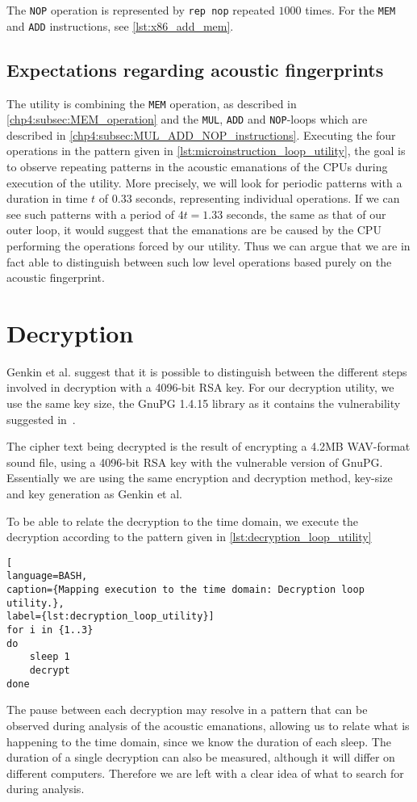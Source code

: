 The \texttt{NOP} operation is represented by \texttt{rep nop} repeated \(1000\) times.
For the \texttt{MEM} and \texttt{ADD} instructions, see \autoref{lst:x86_add_mem}.


\subsection{Expectations regarding acoustic fingerprints}
The utility is combining the \texttt{MEM} operation, as described in \autoref{chp4:subsec:MEM_operation} and the \texttt{MUL}, \texttt{ADD} and \texttt{NOP}-loops which are described in \autoref{chp4:subsec:MUL_ADD_NOP_instructions}.
Executing the four operations in the pattern given in \autoref{lst:microinstruction_loop_utility}, the goal is to observe repeating patterns in the acoustic emanations of the \gls{CPU}s during execution of the utility.
More precisely, we will look for periodic patterns with a duration in time \(t\) of \(0.33\) seconds, representing individual operations. 
If we can see such patterns with a period of \(4t = 1.33\) seconds, the same as that of our outer loop, it would suggest that the emanations are be caused by the \gls{CPU} performing the operations forced by our utility.
Thus we can argue that we are in fact able to distinguish between such low level operations based purely on the acoustic fingerprint. 


\section{Decryption}\label{chp4:sec:decryption}
Genkin et al. suggest that it is possible to distinguish between the different steps involved in decryption with a 4096-bit RSA key.
For our decryption utility, we use the same key size, the GnuPG 1.4.15 library as it contains the vulnerability suggested in~\cite[Sec.~9.1]{DBLP:conf/crypto/GenkinST14}. 

The cipher text being decrypted is the result of encrypting a 4.2MB \gls{WAV}-format sound file, using a 4096-bit RSA key with the vulnerable version of GnuPG.
Essentially we are using the same encryption and decryption method, key-size and key generation as Genkin et al. 

To be able to relate the decryption to the time domain, we execute the decryption according to the pattern given in \autoref{lst:decryption_loop_utility}

\begin{lstlisting}[
language=BASH, 
caption={Mapping execution to the time domain: Decryption loop utility.}, 
label={lst:decryption_loop_utility}]
for i in {1..3}
do
    sleep 1
    decrypt
done
\end{lstlisting}

The pause between each decryption may resolve in a pattern that can be observed during analysis of the acoustic emanations, allowing us to relate what is happening to the time domain, since we know the duration of each sleep.
The duration of a single decryption can also be measured, although it will differ on different computers.
Therefore we are left with a clear idea of what to search for during analysis.
